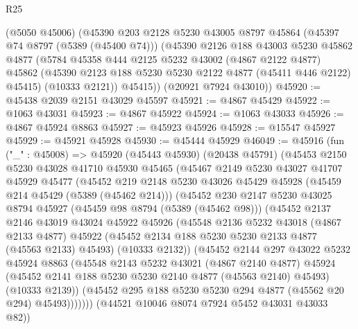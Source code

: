 \begin{lexlean}{R25}
\begin{coremodule}
      (@5050 @45006)
      (@45390
        @203
        @2128
        @5230
        @43005
        @8797
        @45864
        (@45397 @74 @8797 (@5389 (@45400 @74)))
        (@45390
          @2126
          @188
          @43003
          @5230
          @45862
          @4877
          (@5784
            @45358
            @444
            @2125
            @5232
            @43002
            (@4867 @2122 @4877)
            @45862
            (@45390 @2123 @188 @5230 @5230 @2122 @4877 (@45411 @446 @2122) @45415)
            (@10333 @2121))
          @45415))
      (@20921 @7924 @43010))
@45920 := @45438 @2039 @2151 @43029 @45597
@45921 := @4867 @45429
@45922 := @1063 @43031
@45923 := @4867 @45922
@45924 := @1063 @43033
@45926 := @4867 @45924 @8863
@45927 := @45923 @45926
@45928 := @15547 @45927
@45929 := @45921 @45928
@45930 := @45444 @45929
@46049 := @45916
    (fun ("_" : @45008) =>
    @45920
      (@45443 @45930)
      (@20438 @45791)
      (@45453
        @2150
        @5230
        @43028
        @41710
        @45930
        @45465
        (@45467
          @2149
          @5230
          @43027
          @41707
          @45929
          @45477
          (@45452
            @219
            @2148
            @5230
            @43026
            @45429
            @45928
            (@45459 @214 @45429 (@5389 (@45462 @214)))
            (@45452
              @230
              @2147
              @5230
              @43025
              @8794
              @45927
              (@45459 @98 @8794 (@5389 (@45462 @98)))
              (@45452
                @2137
                @2146
                @43019
                @43024
                @45922
                @45926
                (@45548
                  @2136
                  @5232
                  @43018
                  (@4867 @2133 @4877)
                  @45922
                  (@45452 @2134 @188 @5230 @5230 @2133 @4877 (@45563 @2133) @45493)
                  (@10333 @2132))
                (@45452
                  @2144
                  @297
                  @43022
                  @5232
                  @45924
                  @8863
                  (@45548
                    @2143
                    @5232
                    @43021
                    (@4867 @2140 @4877)
                    @45924
                    (@45452 @2141 @188 @5230 @5230 @2140 @4877 (@45563 @2140) @45493)
                    (@10333 @2139))
                  (@45452 @295 @188 @5230 @5230 @294 @4877 (@45562 @20 @294) @45493)))))))
      (@44521 @10046 @8074 @7924 @5452 @43031 @43033 @82))

\end{coremodule}
\end{lexlean}
